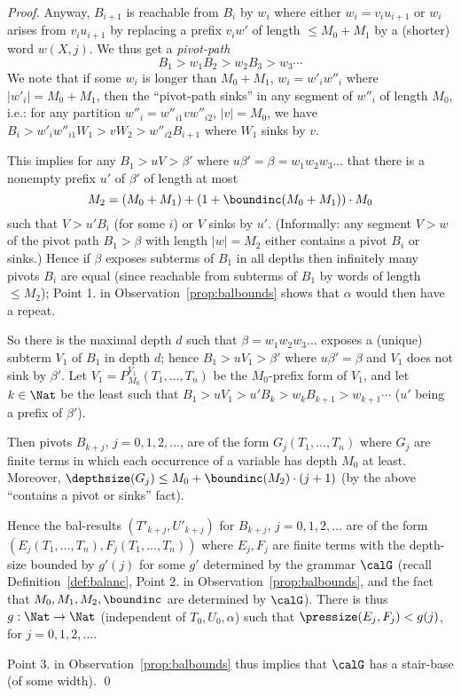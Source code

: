 \documentclass[12pt]{article}
\begin{document}
\begin{proof}
Anyway,
$B_{i+1}$ is reachable from $B_i$ by $w_i$ where either $w_i=v_iu_{i+1}$ 
or $w_i$ arises from $v_iu_{i+1}$ by replacing a prefix
$v_iw'$
of length $\leq M_0+M_1$
by a (shorter) word $w(X,j)$.
We thus get a \emph{pivot-path}
$$B_1\gt{w_1} B_2\gt{w_2}B_3\gt{w_3}\cdots$$
We note that if some $w_i$ is longer than $M_0+M_1$, $w_i=w'_iw''_i$
where $|w'_i|=M_0+M_1$, then the ``pivot-path sinks''
in any segment of $w''_i$ of length $M_0$, i.e.:
for any partition $w''_i=w''_{i1}vw''_{i2}$, $|v|=M_0$, we have 
$B_i\gt{w'_iw''_{i1}}W_1\gt{v}W_2\gt{w''_{i2}}B_{i+1}$ where 
$W_1$ sinks by $v$.


This implies for any 
$B_1\gt{u}V\gt{\beta'}$ where $u\beta'=\beta=w_1w_2w_3\dots$
that there is a nonempty prefix $u'$ of $\beta'$ of length at most
\begin{equation}\label{eq:Mtwo}
M_2= (M_0+M_1) + (1+\boundinc(M_0+M_1))\cdot M_0
\end{equation}
such that
$V\gt{u'}B_i$ (for some $i$) or
$V$ sinks by $u'$. (Informally: any segment $V\gt{w}$
of the pivot path $B_1\gt{\beta}$ with length $|w|=M_2$
either contains a pivot $B_i$ or sinks.)
Hence if $\beta$ exposes subterms of $B_1$ in all depths
then infinitely many pivots $B_i$ are
equal (since reachable from subterms of $B_1$ by words of length
$\leq M_2$);
Point 1. in Observation~\ref{prop:balbounds}  shows 
that $\alpha$ would then have a repeat.

So there is the maximal depth $d$ such that $\beta=w_1w_2w_3\dots$ exposes
a (unique) subterm $V_1$ of $B_1$ in depth $d$; hence
$B_1\gt{u}V_1\gt{\beta'}$ where $u\beta'=\beta$ and 
$V_1$ does not sink by $\beta'$.
Let  $V_1=P_{M_0}^{V_1}(T_1,\dots,T_n)$ be the $M_0$-prefix form of
$V_1$, and let $k\in\Nat$ be the least such that 
$B_1\gt{u}V_1\gt{u'}B_k\gt{w_k}B_{k+1}\gt{w_{k+1}}\cdots$
($u'$ being a prefix of $\beta'$).

Then pivots $B_{k+j}$, $j=0,1,2,\dots$, are of the form 
 $G_{j}(T_1,\dots,T_n)$ where $G_j$ are finite terms in which
 each occurrence 
 of a variable has depth $M_0$
 at least. Moreover, $\depthsize(G_j)\leq M_0+\boundinc(M_2)\cdot
 (j+1)$ (by the above ``contains a pivot or sinks'' fact).
 
 Hence
the bal-results $(T'_{k+j},U'_{k+j})$ for $B_{k+j}$, $j=0,1,2,\dots$
are of the form
$(E_j(T_1,\dots,T_n),F_j(T_1,\dots,T_n))$ 
where $E_j,F_j$ are finite terms with the depth-size bounded by
$g'(j)$ for some $g'$ determined by
the grammar $\calG$ (recall Definition~\ref{def:balanc}, Point 2. in
Observation~\ref{prop:balbounds}, and the fact that 
$M_0, M_1, M_2, \boundinc$ are determined by
$\calG$).
There is thus $g:\Nat\rightarrow\Nat$
(independent of $T_0,U_0,\alpha$) such that 
$\pressize(E_j,F_j)<g(j)$, for $j=0,1,2,\dots$. 

Point 3. in
Observation~\ref{prop:balbounds} thus
implies that $\calG$ has a
stair-base (of some width).
\qed
\end{proof}
\end{document}
